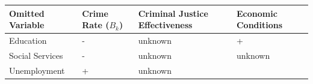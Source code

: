 \documentclass[]{article}
\begin{document}
\begin{longtable}[]{@{}llll@{}}
\toprule
\begin{minipage}[b]{0.18\columnwidth}\raggedright
Omitted Variable\strut
\end{minipage} & \begin{minipage}[b]{0.19\columnwidth}\raggedright
Crime Rate (\(B_k\))\strut
\end{minipage} & \begin{minipage}[b]{0.31\columnwidth}\raggedright
Criminal Justice Effectiveness\strut
\end{minipage} & \begin{minipage}[b]{0.20\columnwidth}\raggedright
Economic Conditions\strut
\end{minipage}\tabularnewline
\midrule
\endhead
\begin{minipage}[t]{0.18\columnwidth}\raggedright
Education\strut
\end{minipage} & \begin{minipage}[t]{0.19\columnwidth}\raggedright
-\strut
\end{minipage} & \begin{minipage}[t]{0.31\columnwidth}\raggedright
unknown\strut
\end{minipage} & \begin{minipage}[t]{0.20\columnwidth}\raggedright
+\strut
\end{minipage}\tabularnewline
\begin{minipage}[t]{0.18\columnwidth}\raggedright
Social Services\strut
\end{minipage} & \begin{minipage}[t]{0.19\columnwidth}\raggedright
-\strut
\end{minipage} & \begin{minipage}[t]{0.31\columnwidth}\raggedright
unknown\strut
\end{minipage} & \begin{minipage}[t]{0.20\columnwidth}\raggedright
unknown\strut
\end{minipage}\tabularnewline
\begin{minipage}[t]{0.18\columnwidth}\raggedright
Unemployment\strut
\end{minipage} & \begin{minipage}[t]{0.19\columnwidth}\raggedright
+\strut
\end{minipage} & \begin{minipage}[t]{0.31\columnwidth}\raggedright
unknown\strut
\end{minipage} & \begin{minipage}[t]{0.20\columnwidth}\raggedright

\end{minipage}
\end{longtable}
\end{document}
